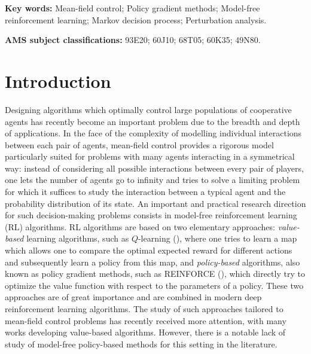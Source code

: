 \documentclass[11pt]{article}
\numberwithin{equation}{section}
\theoremstyle{definition}
\theoremstyle{remark}
\newcommand{\citet}{\cite}
\begin{document}
\medskip

\noindent
\textbf{Key words:} Mean-field control; Policy gradient methods; Model-free reinforcement learning; Markov decision process; Perturbation analysis.  

 

%

\vspace{5mm}  

\noindent
\textbf{AMS subject classifications:} 93E20; 60J10; 68T05;  60K35; 49N80. 

%
\medskip

\section{Introduction}\label{sec:intro}

Designing algorithms which optimally control large populations of cooperative agents has recently become an important problem due to the breadth and depth of applications. In the face of the complexity of modelling individual interactions between each pair of agents, mean-field control provides a rigorous model particularly suited for problems with many agents interacting in a symmetrical way: instead of considering all possible interactions between every pair of players, one lets the number of agents go to infinity and tries to solve a limiting problem for which it suffices to study the interaction between a typical agent and the probability distribution of its state. 
An important and practical research direction for such decision-making problems consists in model-free reinforcement learning (RL) algorithms.
RL algorithms are based on two elementary approaches: \textit{value-based} learning algorithms, such as $Q$-learning (\citet{watkins1992q}), where one tries to learn a map which allows one to compare the optimal expected reward for different actions and subsequently learn a policy from this map, and \textit{policy-based} algorithms, also known as policy gradient methods, such as REINFORCE (\citet{williams1992simple}), which directly try to optimize the value function with respect to the parameters of a policy. These two approaches are of great importance and are combined in modern deep reinforcement learning algorithms.
The study of such approaches tailored to mean-field control problems has recently received more attention, with many works developing value-based algorithms.
However, there is a notable lack of study of model-free policy-based methods for this setting in the literature.
\end{document}
